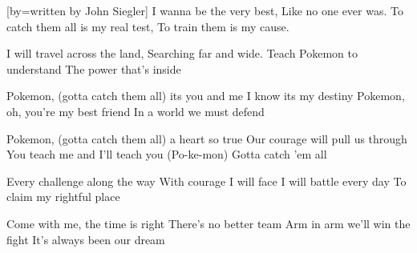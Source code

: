 [by={written by John Siegler}]
\beginverse
I wanna be the very best,
Like no one ever was.
To catch them all is my real test,
To train them is my cause.
\endverse

\beginverse
I will travel across the land,
Searching far and wide.
Teach Pokemon to understand
The power that's inside
\endverse

\beginchorus
Pokemon, (gotta catch them all) its you and me
I know its my destiny
Pokemon, oh, you're my best friend
In a world we must defend
\endchorus

\beginchorus
Pokemon, (gotta catch them all) a heart so true
Our courage will pull us through
You teach me and I'll teach you
(Po-ke-mon) Gotta catch 'em all
\endchorus

\beginverse
Every challenge along the way
With courage I will face
I will battle every day
To claim my rightful place
\endverse

\beginverse
Come with me, the time is right
There's no better team
Arm in arm we'll win the fight
It's always been our dream
\endverse
\endsong
